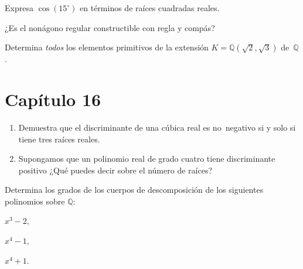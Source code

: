 \documentclass[12pt]{article}
\begin{document}
    \begin{exercise}[15.5.1]
        Expresa $\cos(15^{\circ})$ en términos de raíces cuadradas reales.
    \end{exercise}
    
    \begin{exercise}[15.5.3]
        ¿Es el nonágono regular constructible con regla y compás?
    \end{exercise}
    
    \begin{exercise}[15.8.2]
        Determina \emph{todos} los elementos primitivos de la extensión $K=\mathbb{Q}(\sqrt{2}, \sqrt{3})$ de~$\mathbb{Q}$.
    \end{exercise}
    
    
    
    
    
    
    \section*{Capítulo 16} %
    \label{sec:capitulo_16}
    
    
    
    \begin{exercise}[16.2.2]\quad
        \begin{enumerate}[\bfseries(a)]
            \item Demuestra que el discriminante de una cúbica real es no~negativo si y solo si tiene tres raíces reales.
            
            \item Supongamos que un polinomio real de grado cuatro tiene discriminante positivo ¿Qué puedes decir sobre el número de raíces?
        \end{enumerate}
    
    \end{exercise}
    
    \begin{exercise}[16.3.2]
        Determina los grados de los cuerpos de descomposición de los siguientes polinomios sobre $\mathbb{Q}$:
        
        
        \noindent
        \begin{inparaenum}[\bfseries(a)]
            \item $x^{3}-2$,
            \item $x^{4}-1$,
            \item $x^{4}+1$.
        \end{inparaenum}
    \end{exercise}
    
\end{document}
